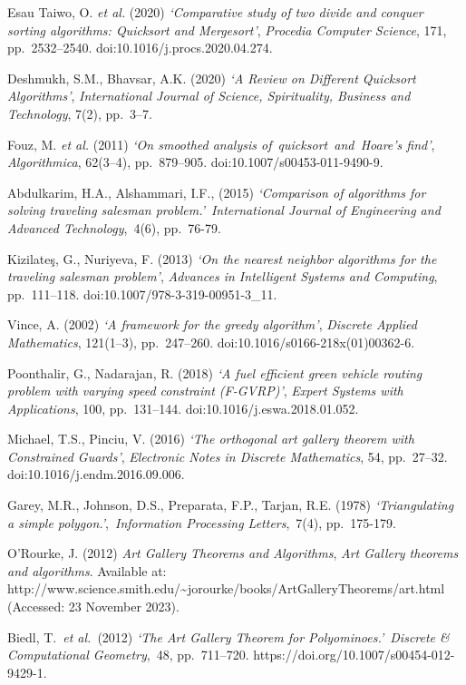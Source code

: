 \documentclass[
]{article}
\begin{document}
Esau Taiwo, O. \emph{et al.} (2020) \emph{`Comparative study of two
divide and conquer sorting algorithms: Quicksort and Mergesort'},
\emph{Procedia Computer Science}, 171, pp.~2532--2540.
doi:10.1016/j.procs.2020.04.274.

Deshmukh, S.M., Bhavsar, A.K. (2020) \emph{`A Review on Different
Quicksort Algorithms'}, \emph{International Journal of Science,
Spirituality, Business and Technology}, 7(2), pp.~3--7.

Fouz, M. \emph{et al.} (2011) \emph{`On smoothed analysis
of~quicksort~and~Hoare's find'}, \emph{Algorithmica}, 62(3--4),
pp.~879--905. doi:10.1007/s00453-011-9490-9.

Abdulkarim, H.A., Alshammari, I.F., (2015) \emph{`Comparison of
algorithms for solving traveling salesman problem.'}~\emph{International
Journal of Engineering and Advanced Technology},~4(6), pp.~76-79.

Kizilateş, G., Nuriyeva, F. (2013) \emph{`On the nearest neighbor
algorithms for the traveling salesman problem'}, \emph{Advances in
Intelligent Systems and Computing}, pp.~111--118.
doi:10.1007/978-3-319-00951-3\_11.

Vince, A. (2002) \emph{`A framework for the greedy algorithm'},
\emph{Discrete Applied Mathematics}, 121(1--3), pp.~247--260.
doi:10.1016/s0166-218x(01)00362-6.

Poonthalir, G., Nadarajan, R. (2018) \emph{`A fuel efficient green
vehicle routing problem with varying speed constraint (F-GVRP)'},
\emph{Expert Systems with Applications}, 100, pp.~131--144.
doi:10.1016/j.eswa.2018.01.052.

Michael, T.S., Pinciu, V. (2016) \emph{`The orthogonal art gallery
theorem with Constrained Guards'}, \emph{Electronic Notes in Discrete
Mathematics}, 54, pp.~27--32. doi:10.1016/j.endm.2016.09.006.

Garey, M.R., Johnson, D.S., Preparata, F.P., Tarjan, R.E. (1978)
\emph{`Triangulating a simple polygon.'},~\emph{Information Processing
Letters},~7(4), pp.~175-179.

O'Rourke, J. (2012) \emph{Art Gallery Theorems and Algorithms},
\emph{Art Gallery theorems and algorithms}. Available at:
http://www.science.smith.edu/\textasciitilde jorourke/books/ArtGalleryTheorems/art.html
(Accessed: 23 November 2023).

Biedl, T.~\emph{et al.}~(2012) \emph{`The Art Gallery Theorem for
Polyominoes.'}~\emph{Discrete \& Computational Geometry},~48,
pp.~711--720. https://doi.org/10.1007/s00454-012-9429-1.
\end{document}
